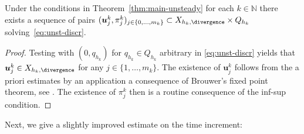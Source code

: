 \documentclass[reqno,a4paper]{amsart}
\def\vec#1{\boldsymbol{#1}}
\def\bu{\vec{u}}
\begin{document}
\begin{lemma}\label{lem:ex} 
	Under the conditions in Theorem~\ref{thm:main-unsteady} for each $k \in \mathbb{N}$ there exists a sequence of pairs $( \bu^k_j, \pi^k_j)_{j \in \{0, \ldots, m_k\}} \subset   X_{h_k,\divergence} \times Q_{h_k}$  solving~\eqref{eq:unst-discr}.  
\end{lemma}
\begin{proof}
	Testing with $(0,q_{h_k})$ for $q_{h_k} \in Q_{h_k}$ arbitrary in \eqref{eq:unst-discr} yields that $\bu_j^k \in X_{h_k,\divergence}$ for any $j \in \{1, \ldots, m_k\}$.
	The existence of $\bu^k_j$ follows from the a priori estimates by an application a consequence of Brouwer's
	fixed point theorem, see \cite[§~5.7, (G.7), p.~104]{Granas2003}. 
	The existence of $\pi^k_j$ then is a routine  consequence of the inf-sup condition. 
\end{proof}
Next, we give a slightly improved estimate on the time increment: 
\end{document}
